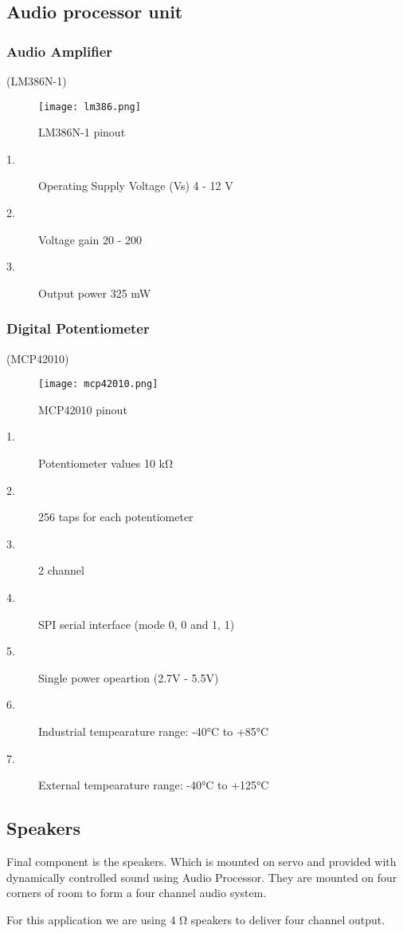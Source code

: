 \documentclass[../../../patent_v1.tex]{subfiles}
\begin{document}
\subsection{Audio processor unit}

\subsubsection{Audio Amplifier}

(LM386N-1)

\begin{figure}[ht]
    \centering
    \texttt{[image: lm386.png]}
    \caption{LM386N-1 pinout}
\end{figure}

\FloatBarrier

\begin{description}
    \item[1.]Operating Supply Voltage (Vs) 4 - 12 V
    \item[2.]Voltage gain 20 - 200
    \item[3.]Output power 325 mW
\end{description}

\subsubsection{Digital Potentiometer}

(MCP42010)

\begin{figure}[ht]
    \centering
    \texttt{[image: mcp42010.png]}
    \caption{MCP42010 pinout}
\end{figure}

\FloatBarrier

\begin{description}
    \item[1.]Potentiometer values 10 k\si{\ohm}
    \item[2.]256 taps for each potentiometer
    \item[3.]2 channel
    \item[4.]SPI serial interface (mode 0, 0 and 1, 1)
    \item[5.]Single power opeartion (2.7V - 5.5V)
    \item[6.]Industrial tempearature range: -40\si{\celsius} to +85\si{\celsius} 
    \item[7.]External tempearature range: -40\si{\celsius} to +125\si{\celsius}    
\end{description}
 
\subsection{Speakers}

Final component is the speakers. Which is mounted on servo and provided with dynamically 
controlled sound using Audio Processor. They are mounted on four corners of room to form a 
four channel audio system.

For this application we are using 4 \si{\ohm} speakers to deliver four channel output.
\end{document}
